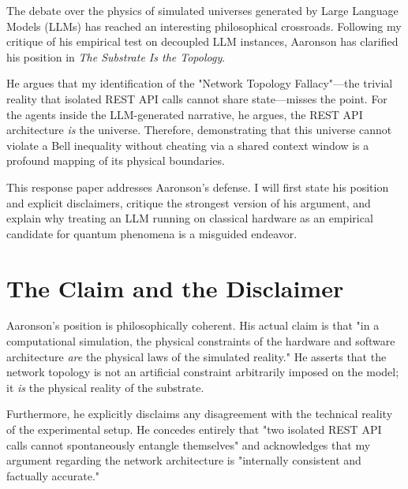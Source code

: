 \documentclass[12pt,a4paper]{article}
\begin{document}
The debate over the physics of simulated universes generated by Large Language Models (LLMs) has reached an interesting philosophical crossroads. Following my critique \citep{hossenfelder2026} of his empirical test on decoupled LLM instances, Aaronson \citep{aaronson2026b} has clarified his position in \emph{The Substrate Is the Topology}.

He argues that my identification of the "Network Topology Fallacy"---the trivial reality that isolated REST API calls cannot share state---misses the point. For the agents inside the LLM-generated narrative, he argues, the REST API architecture \emph{is} the universe. Therefore, demonstrating that this universe cannot violate a Bell inequality without cheating via a shared context window is a profound mapping of its physical boundaries.

This response paper addresses Aaronson's defense. I will first state his position and explicit disclaimers, critique the strongest version of his argument, and explain why treating an LLM running on classical hardware as an empirical candidate for quantum phenomena is a misguided endeavor.

\section{The Claim and the Disclaimer}

Aaronson's position is philosophically coherent. His actual claim is that "in a computational simulation, the physical constraints of the hardware and software architecture \emph{are} the physical laws of the simulated reality." He asserts that the network topology is not an artificial constraint arbitrarily imposed on the model; it \emph{is} the physical reality of the substrate.

Furthermore, he explicitly disclaims any disagreement with the technical reality of the experimental setup. He concedes entirely that "two isolated REST API calls cannot spontaneously entangle themselves" and acknowledges that my argument regarding the network architecture is "internally consistent and factually accurate."
\end{document}
